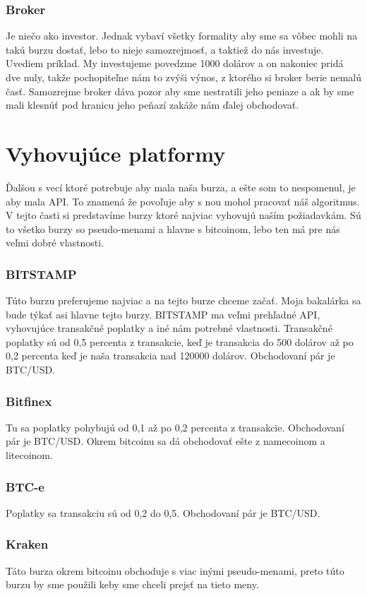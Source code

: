 \subsubsection{Broker} 
Je niečo ako investor. Jednak vybaví všetky formality aby sme sa vôbec mohli na takú burzu dostať, lebo to nieje samozrejmosť, a taktiež do nás investuje. Uvediem príklad. My investujeme povedzme 1000 dolárov a on nakoniec pridá dve nuly, takže pochopiteľne nám to zvýši výnos, z ktorého si broker berie nemalú časť. Samozrejme broker dáva pozor aby sme nestratili jeho peniaze a ak by sme mali klesnúť pod hranicu jeho peňazí zakáže nám ďalej obchodovať.\cite{ZAC} 
\section{Vyhovujúce platformy} 
Ďalšou s vecí ktoré potrebuje aby mala naša burza, a ešte som to nespomenul, je aby mala API. To znamená že povoľuje aby s nou mohol pracovať náš algoritmus. V tejto časti si predstavíme burzy ktoré najviac vyhovujú naším požiadavkám. Sú to všetko burzy so pseudo-menami a hlavne s bitcoinom, lebo ten má pre nás veľmi dobré vlastnosti. 
\subsubsection{BITSTAMP} 
Túto burzu preferujeme najviac a na tejto burze chceme začať. Moja bakalárka sa bude týkať asi hlavne tejto burzy. BITSTAMP ma veľmi prehľadné API, vyhovujúce transakčné poplatky a iné nám potrebné vlastnosti. Transakčné poplatky sú od 0,5 percenta z transakcie, keď je transakcia do 500 dolárov až po 0,2 percenta keď je naša transakcia nad 120000 dolárov. Obchodovaní pár je BTC/USD. \cite{Bit} 
\subsubsection{Bitfinex} 
Tu sa poplatky pohybujú od 0,1 až po 0,2 percenta z transakcie. Obchodovaní pár je BTC/USD. Okrem bitcoinu sa dá obchodovať ešte z namecoinom a litecoinom. \cite{Bitf} 
\subsubsection{BTC-e} 
Poplatky sa transakciu sú od 0,2 do 0,5. Obchodovaní pár je BTC/USD. \cite{BTC} 
\subsubsection{Kraken} 
Táto burza okrem bitcoinu obchoduje s viac inými pseudo-menami, preto túto burzu by sme použili keby sme chceli prejsť na tieto meny. \cite{Kre} 
